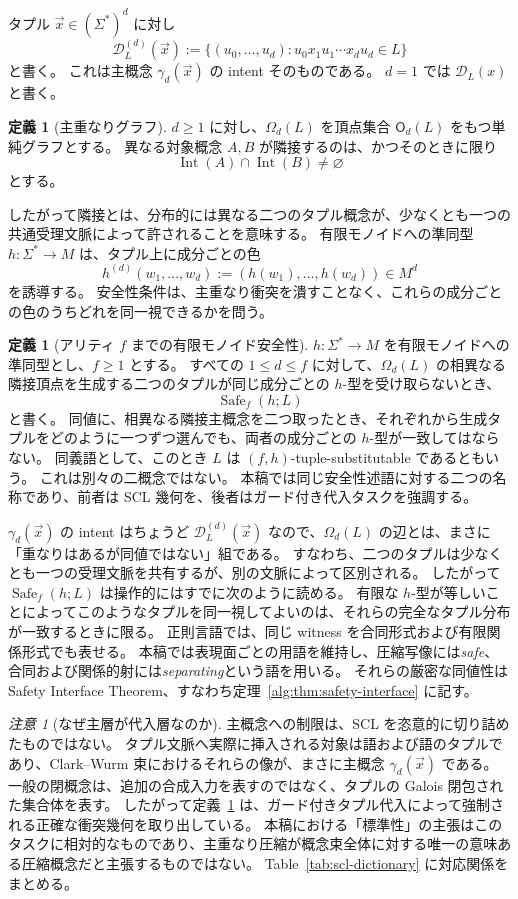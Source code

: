 \documentclass[10pt,a4paper]{ltjsarticle}
\theoremstyle{definition}
\newtheorem{definition}[theorem]{定義}
\theoremstyle{remark}
\newtheorem{remark}[theorem]{注意}
\newcommand{\D}{\mathcal D}
\newcommand{\Obj}{\mathsf O}
\newcommand{\Om}{\Omega}
\begin{document}
タプル $\vec x\in(\Sigma^*)^d$ に対し
\[
\D_L^{(d)}(\vec x)
:=\{(u_0,\ldots,u_d):u_0x_1u_1\cdots x_du_d\in L\}
\]
と書く。
これは主概念 $\gamma_d(\vec x)$ の intent そのものである。
$d=1$ では $\D_L(x)$ と書く。

\begin{definition}[主重なりグラフ]
$d\ge1$ に対し、$\Om_d(L)$ を頂点集合 $\Obj_d(L)$ をもつ単純グラフとする。
異なる対象概念 $A,B$ が隣接するのは、かつそのときに限り
\[
\operatorname{Int}(A)\cap\operatorname{Int}(B)\ne\varnothing
\]
とする。
\end{definition}

したがって隣接とは、分布的には異なる二つのタプル概念が、少なくとも一つの共通受理文脈によって許されることを意味する。
有限モノイドへの準同型 $h:\Sigma^*\to M$ は、タプル上に成分ごとの色
\[
h^{(d)}(w_1,\ldots,w_d)
:=(h(w_1),\ldots,h(w_d))\in M^d
\]
を誘導する。
安全性条件は、主重なり衝突を潰すことなく、これらの成分ごとの色のうちどれを同一視できるかを問う。

\begin{definition}[アリティ $f$ までの有限モノイド安全性]
\label{scl:def:safety}
$h:\Sigma^*\to M$ を有限モノイドへの準同型とし、$f\ge1$ とする。
すべての $1\le d\le f$ に対して、$\Om_d(L)$ の相異なる隣接頂点を生成する二つのタプルが同じ成分ごとの $h$-型を受け取らないとき、
\[
\operatorname{Safe}_f(h;L)
\]
と書く。
同値に、相異なる隣接主概念を二つ取ったとき、それぞれから生成タプルをどのように一つずつ選んでも、両者の成分ごとの $h$-型が一致してはならない。
同義語として、このとき $L$ は $(f,h)$-tuple-substitutable であるともいう。
これは別々の二概念ではない。
本稿では同じ安全性述語に対する二つの名称であり、前者は SCL 幾何を、後者はガード付き代入タスクを強調する。
\end{definition}

$\gamma_d(\vec x)$ の intent はちょうど $\D_L^{(d)}(\vec x)$ なので、$\Om_d(L)$ の辺とは、まさに「重なりはあるが同値ではない」組である。
すなわち、二つのタプルは少なくとも一つの受理文脈を共有するが、別の文脈によって区別される。
したがって $\operatorname{Safe}_f(h;L)$ は操作的にはすでに次のように読める。
有限な $h$-型が等しいことによってこのようなタプルを同一視してよいのは、それらの完全なタプル分布が一致するときに限る。
正則言語では、同じ witness を合同形式および有限関係形式でも表せる。
本稿では表現面ごとの用語を維持し、圧縮写像には\emph{safe}、合同および関係的射には\emph{separating}という語を用いる。
それらの厳密な同値性は Safety Interface Theorem、すなわち定理~\ref{alg:thm:safety-interface} に記す。

\begin{remark}[なぜ主層が代入層なのか]
\label{scl:rem:principal-canonical}
主概念への制限は、SCL を恣意的に切り詰めたものではない。
タプル文脈へ実際に挿入される対象は語および語のタプルであり、Clark--Wurm 束におけるそれらの像が、まさに主概念 $\gamma_d(\vec x)$ である。
一般の閉概念は、追加の合成入力を表すのではなく、タプルの Galois 閉包された集合体を表す。
したがって定義~\ref{scl:def:safety} は、ガード付きタプル代入によって強制される正確な衝突幾何を取り出している。
本稿における「標準性」の主張はこのタスクに相対的なものであり、主重なり圧縮が概念束全体に対する唯一の意味ある圧縮概念だと主張するものではない。
Table~\ref{tab:scl-dictionary} に対応関係をまとめる。
\end{remark}
\end{document}
